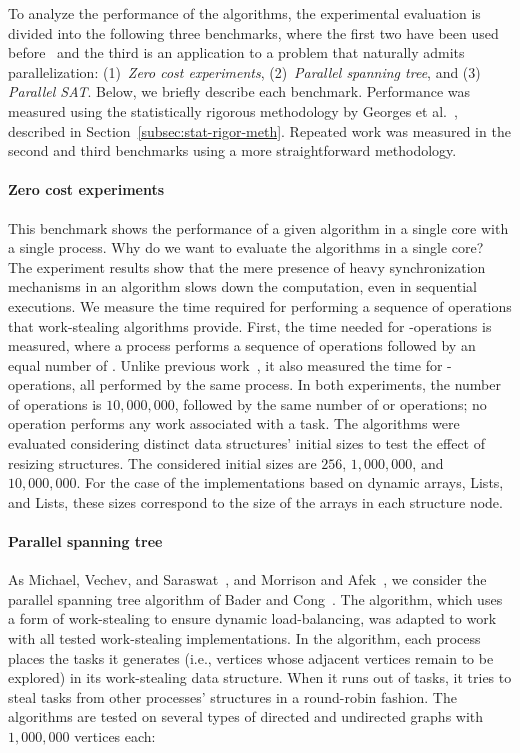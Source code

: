 To analyze the performance of the algorithms, the experimental evaluation is divided into the following three benchmarks, where the first two have been used before~\cite{DBLP_conf_pldi_FrigoLR98, maged.vechev.2009, fencefreework} and the third is an application to a problem that naturally admits parallelization: (1)~\textit{Zero cost experiments}, (2)~\textit{Parallel spanning tree}, and (3) \textit{Parallel SAT}. Below, we briefly describe each benchmark.  Performance was measured using the statistically rigorous methodology by Georges et al.~\cite{DBLP_conf_oopsla_GeorgesBE07}, described in Section~\ref{subsec:stat-rigor-meth}.  Repeated work was measured in the second and third benchmarks using a more straightforward methodology.

\paragraph*{Zero cost experiments\label{zero-cost-experiment}}

This benchmark shows the performance of a given algorithm in a single core with a single process. Why do we want to evaluate the algorithms in a single core? The experiment results show that the mere presence of heavy synchronization mechanisms in an algorithm slows down the computation, even in sequential executions. We measure the time required for performing a sequence of operations that work-stealing algorithms provide. First, the time needed for \Put-\Take operations is measured, where a process performs a sequence of \Put operations followed by an equal number of \Takes. Unlike previous work~\cite{maged.vechev.2009, fencefreework}, it also measured the time for \Put-\Steal operations, all performed by the same process. In both experiments, the number of \Put operations is \(10,000,000\), followed by the same number of \Take or \Steal operations; no operation performs any work associated with a task. The algorithms were evaluated considering distinct data structures' initial sizes to test the effect of resizing structures. The considered initial sizes are \(256\), \(1,000,000\), and \(10,000,000\).  For the case of the implementations based on dynamic arrays, \NCWSM Lists, and \BNCWSM Lists, these sizes correspond to the size of the arrays in each structure node.

\paragraph*{Parallel spanning tree\label{irregular-graph}}
As Michael, Vechev, and Saraswat~\cite{maged.vechev.2009}, and Morrison and Afek~\cite{fencefreework}, we consider the parallel spanning tree algorithm of Bader and Cong~\cite{1302951}. The algorithm, which uses a form of work-stealing to ensure dynamic load-balancing, was adapted to work with all tested work-stealing implementations. In the algorithm, each process places the tasks it generates (i.e., vertices whose adjacent vertices remain to be explored) in its work-stealing data structure. When it runs out of tasks, it tries to steal tasks from other processes' structures in a round-robin fashion. The algorithms are tested on several types of directed and undirected graphs with $1,000,000$ vertices each:

